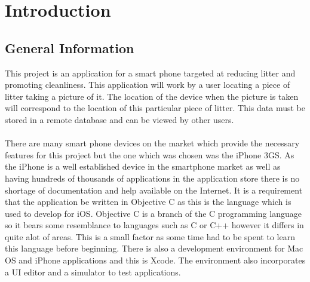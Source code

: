 \documentclass[12pt]{article}
\begin{document}
\newpage



\label{sec:Subsection}

\section{Introduction}


\subsection{General Information}

This project is an application for a smart phone targeted at reducing litter and promoting cleanliness. This application will work by a user locating a piece of litter taking a picture of it. The location of the device when the picture is taken will correspond to the location of this particular piece of litter. This data must be stored in a remote database and can be viewed by other users.

\paragraph{}
\label{par:Second Paragraph}


There are many smart phone devices on the market which provide the necessary features for this project but the one which was chosen was the iPhone 3GS.
As the iPhone is a well established device in the smartphone market as well as having hundreds of thousands of applications in the application store there is no shortage of documentation and help available on the Internet.
It is a requirement that the application be written in Objective C as this is the language which is used to develop for iOS. Objective C is a branch of the C programming language so it bears some resemblance to languages such as C or C++ however it differs in quite alot of areas. This is a small factor as some time had to be spent to learn this language before beginning. There is also a development environment for Mac OS and iPhone applications and this is Xcode. The environment also incorporates a UI editor and a simulator to test applications.

\paragraph{}
\label{par:Second Paragraph}
\end{document}
